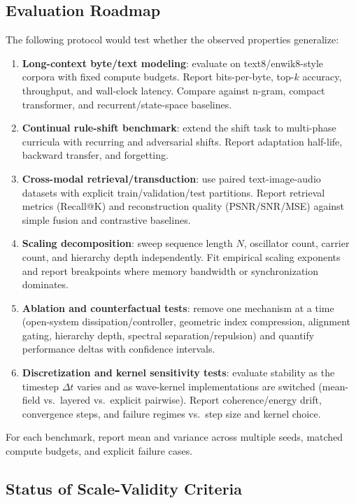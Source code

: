 \documentclass[11pt,a4paper]{article}
\newcommand{\dt}{\Delta t}
\begin{document}
\subsection{Evaluation Roadmap}

The following protocol would test whether the observed properties generalize:

\begin{enumerate}
  \item \textbf{Long-context byte/text modeling}: evaluate on text8/enwik8-style corpora with fixed compute budgets. Report bits-per-byte, top-$k$ accuracy, throughput, and wall-clock latency. Compare against n-gram, compact transformer, and recurrent/state-space baselines.
  \item \textbf{Continual rule-shift benchmark}: extend the shift task to multi-phase curricula with recurring and adversarial shifts. Report adaptation half-life, backward transfer, and forgetting.
  \item \textbf{Cross-modal retrieval/transduction}: use paired text-image-audio datasets with explicit train/validation/test partitions. Report retrieval metrics (Recall@K) and reconstruction quality (PSNR/SNR/MSE) against simple fusion and contrastive baselines.
  \item \textbf{Scaling decomposition}: sweep sequence length $N$, oscillator count, carrier count, and hierarchy depth independently. Fit empirical scaling exponents and report breakpoints where memory bandwidth or synchronization dominates.
  \item \textbf{Ablation and counterfactual tests}: remove one mechanism at a time (open-system dissipation/controller, geometric index compression, alignment gating, hierarchy depth, spectral separation/repulsion) and quantify performance deltas with confidence intervals.
  \item \textbf{Discretization and kernel sensitivity tests}: evaluate stability as the timestep \(\dt\) varies and as wave-kernel implementations are switched (mean-field vs.\ layered vs.\ explicit pairwise). Report coherence/energy drift, convergence steps, and failure regimes vs.\ step size and kernel choice.
\end{enumerate}

For each benchmark, report mean and variance across multiple seeds, matched compute budgets, and explicit failure cases.

\subsection{Status of Scale-Validity Criteria}
\end{document}
